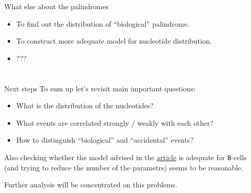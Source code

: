 \documentclass{beamer}\usepackage[]{graphicx}\usepackage[]{color}
\begin{document}
\begin{frame}{What else about the palindromes}
  \begin{itemize}
    \item To find out the distribution of ``biological'' palindrome.
    \item To construct more adequate model for nucleotide distribution.
    \item ???
  \end{itemize}
\end{frame}

\section{}
\begin{frame}{Next steps}
  To sum up let's revisit main important questions:
  \begin{itemize}
    \item What is the distribution of the nucleotides?
    \item What events are correlated strongly / weakly with each other?
    \item How to distinguish ``biological'' and ``accidental'' events?
  \end{itemize}
  \bigskip
  Also checking whether the model advised in the \href{http://www.pnas.org/content/109/40/16161.full}{%
  article} is adequate for \texttt{B}-cells (and trying to reduce the number of the parametrs) seems to be reasonable.


  \bigskip
  Further analysis will be concentrated on this problems.
\end{frame}
\end{document}
